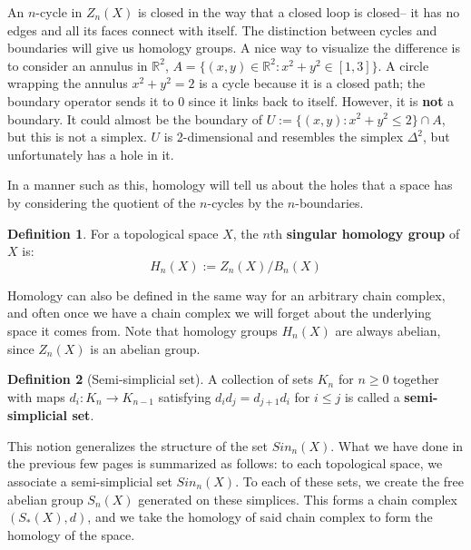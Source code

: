\documentclass[11pt, oneside]{amsart}   	%
\theoremstyle{definition}
\newtheorem{definition}{Definition}[section]
\begin{document}
An $n$-cycle in $Z_n(X)$ is closed in the way that a closed loop is closed-- it has no edges and all its 
faces connect with itself. The distinction between cycles and boundaries will give us homology groups. 
A nice way to visualize the difference is to consider an annulus in $\mathbb R^2$, $A = \{(x, y)\in\mathbb 
R^2 : x^2 + y^2\in [1, 3]\}$. A circle wrapping the annulus $x^2 + y^2 = 2$ is a cycle because it is a 
closed path; the boundary operator sends it to 0 since it links back to itself. However, it is \textbf{not} 
a boundary. It could almost be the boundary of $U := \{(x, y) : x^2 + y^2 \leq 2\}\cap A$, but this is not a 
simplex. $U$ is 2-dimensional and resembles the simplex $\Delta^2$, but unfortunately has a hole in it. 

In a manner such as this, homology will tell us about the holes that a space has by considering the 
quotient of the $n$-cycles by the $n$-boundaries. 

\begin{definition}
	For a topological space $X$, the $n$th \textbf{singular homology group} of $X$ is:
	\begin{equation}
		H_n(X) := Z_n(X) / B_n(X)
	\end{equation}
\end{definition}

Homology can also be defined in the same way for an arbitrary chain complex, and often once we have a 
chain complex we will forget about the underlying space it comes from. Note that homology groups 
$H_n(X)$ are always abelian, since $Z_n(X)$ is an abelian group. 

\begin{definition}[Semi-simplicial set]
	A collection of sets $K_n$ for $n\geq 0$ together with maps $d_i : K_n\rightarrow K_{n - 1}$ satisfying $d_i d_j = 
	d_{j + 1}d_i$ for $i\leq j$ is called a \textbf{semi-simplicial set}. 
\end{definition}

This notion generalizes the structure of the set $Sin_n(X)$. What we have done in the previous few pages is summarized 
as follows: to each topological space, we associate a semi-simplicial set $Sin_n(X)$. To each of these sets, we create the 
free abelian group $S_n(X)$ generated on these simplices. This forms a chain complex $(S_*(X), d)$, and we take the 
homology of said chain complex to form the homology of the space. 
\end{document}
